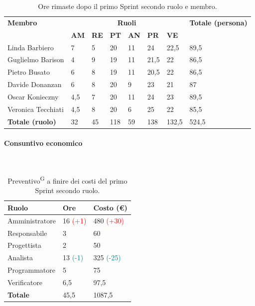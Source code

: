 \documentclass[8pt]{article}
\newcommand{\glossterm}[1]{#1\textsuperscript{G}} %
\newcommand{\subsubsubsection}[1]{\paragraph{#1}\mbox{}\\}
\begin{document}
\begin{table}[ht!]
	\centering
	\begin{tabular}{p{4cm} p{1cm} p{1cm} p{1cm} p{1cm} p{1cm} p{1cm} p{3cm}}
		\toprule
        \textbf{Membro} & \multicolumn{6}{c}{\textbf{Ruoli}} & \textbf{Totale (persona)}\\
		& \textbf{AM} & \textbf{RE} & \textbf{PT} & \textbf{AN} & \textbf{PR} & \textbf{VE}\\
		\midrule
        Linda Barbiero          & 7     & 5     & 20     & 11   & 24     & 22,5   & 89,5 \\
        Guglielmo Barison       & 4     & 9     & 19     & 11   & 21,5   & 22     & 86,5\\
        Pietro Busato           & 6     & 8     & 19     & 11   & 20,5   & 22     & 86,5 \\
        Davide Donanzan         & 6     & 8     & 20     & 9    & 23     & 21     & 87 \\
        Oscar Konieczny         & 4,5   & 7     & 20     & 11   & 24     & 23     & 89,5 \\
        Veronica Tecchiati      & 4,5   & 8     & 20     & 6    & 25     & 22     & 85,5 \\
        \bottomrule
        \textbf{Totale (ruolo)} & 32    & 45    & 118    & 59   & 138     & 132,5 & 524,5 \\
	\end{tabular}
	\caption{Ore rimaste dopo il primo Sprint secondo ruolo e membro.}
	\label{table:Ore rimaste dopo il primo Sprint secondo ruolo e membro}
\end{table}
\subsubsubsection{Consuntivo economico}
\begin{table}[ht!]
	\centering
	\begin{tabular}{p{4cm} p{2cm} p{2cm}}
        \toprule
        \textbf{Ruolo} & \textbf{Ore} & \textbf{Costo (€)} \\
        \midrule
        Amministratore & 16 \textcolor{red}{(+1)} & 480 \textcolor{red}{(+30)} \\
        Responsabile & 3 & 60 \\
        Progettista & 2 & 50 \\
        Analista & 13 \textcolor{teal}{(-1)} & 325 \textcolor{teal}{(-25)} \\
        Programmatore & 5 & 75 \\
        Verificatore & 6,5 & 97,5 \\
        \bottomrule
        \textbf{Totale} & 45,5 & 1087,5
    \end{tabular}
    \caption{\glossterm{Preventivo} a finire dei costi del primo Sprint secondo ruolo.}
	\label{table:Preventivo a finire dei costi del primo Sprint secondo ruolo}
\end{table}
\end{document}

